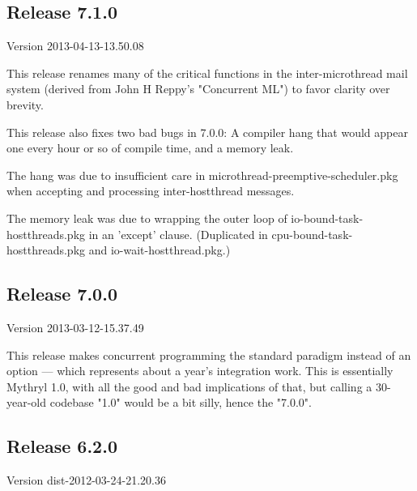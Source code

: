 
\subsection{Release 7.1.0}
\label{section:src:release-7.1.0}

Version 2013-04-13-13.50.08

This release renames many of the critical functions in the inter-microthread 
mail system (derived from John H Reppy's "Concurrent ML") to favor clarity over 
brevity.

This release also fixes two bad bugs in 7.0.0:  A compiler hang that would appear 
one every hour or so of compile time, and a memory leak.

The hang was due to 
insufficient care in microthread-preemptive-scheduler.pkg when accepting and 
processing inter-hostthread messages.

The memory leak was due to wrapping the 
outer loop of io-bound-task-hostthreads.pkg in an 'except' clause. (Duplicated 
in cpu-bound-task-hostthreads.pkg and io-wait-hostthread.pkg.)


\cutend*

\subsection{Release 7.0.0}
\label{section:src:release-7.0.0}

Version 2013-03-12-15.37.49

This release makes concurrent programming the standard paradigm instead 
of an option --- which represents about a year's integration work.  This is essentially 
Mythryl 1.0, with all the good and bad implications of that, but calling a 30-year-old 
codebase "1.0" would be a bit silly, hence the "7.0.0".

\cutend*



\subsection{Release 6.2.0}
\label{section:src:release-6.2.0}

Version dist-2012-03-24-21.20.36

